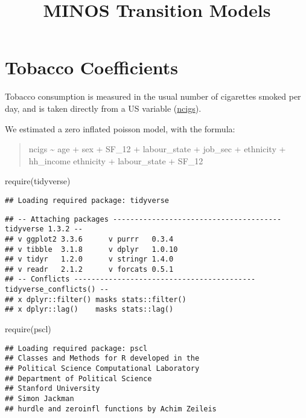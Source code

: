 \documentclass[
]{article}
\title{MINOS Transition Models}
\author{}
\date{\vspace{-2.5em}}
\newenvironment{Shaded}{\begin{snugshade}}{\end{snugshade}}
\newcommand{\FunctionTok}[1]{\textcolor[rgb]{0.00,0.00,0.00}{#1}}
\newcommand{\NormalTok}[1]{#1}
\begin{document}
\maketitle

\hypertarget{tobacco-coefficients}{%
\section{Tobacco Coefficients}\label{tobacco-coefficients}}

Tobacco consumption is measured in the usual number of cigarettes smoked
per day, and is taken directly from a US variable
(\href{https://www.understandingsociety.ac.uk/documentation/mainstage/dataset-documentation/variable/ncigs}{ncigs}).

We estimated a zero inflated poisson model, with the formula:

\begin{quote}
ncigs \textasciitilde{} age + sex + SF\_12 + labour\_state + job\_sec +
ethnicity + hh\_income \textbar{} ethnicity + labour\_state + SF\_12
\end{quote}

\begin{Shaded}
\begin{Highlighting}[]
\FunctionTok{require}\NormalTok{(tidyverse)}
\end{Highlighting}
\end{Shaded}

\begin{verbatim}
## Loading required package: tidyverse
\end{verbatim}

\begin{verbatim}
## -- Attaching packages --------------------------------------- tidyverse 1.3.2 --
## v ggplot2 3.3.6      v purrr   0.3.4 
## v tibble  3.1.8      v dplyr   1.0.10
## v tidyr   1.2.0      v stringr 1.4.0 
## v readr   2.1.2      v forcats 0.5.1 
## -- Conflicts ------------------------------------------ tidyverse_conflicts() --
## x dplyr::filter() masks stats::filter()
## x dplyr::lag()    masks stats::lag()
\end{verbatim}

\begin{Shaded}
\begin{Highlighting}[]
\FunctionTok{require}\NormalTok{(pscl)}
\end{Highlighting}
\end{Shaded}

\begin{verbatim}
## Loading required package: pscl
## Classes and Methods for R developed in the
## Political Science Computational Laboratory
## Department of Political Science
## Stanford University
## Simon Jackman
## hurdle and zeroinfl functions by Achim Zeileis
\end{verbatim}
\end{document}
